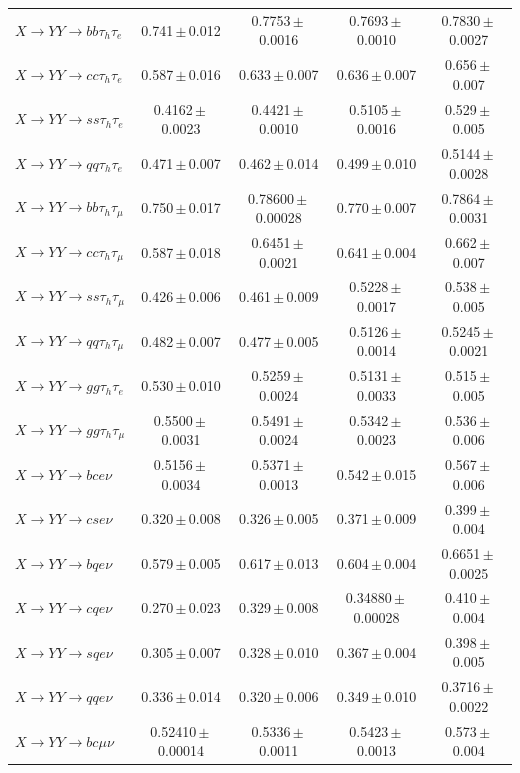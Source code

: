 \documentclass[12pt]{article}   %
\begin{document}
\begin{landscape}
{\begin{longtable}{@{\extracolsep{\fill}}lcccc@{}}
\midrule
$X\to YY\to bb\tau_h\tau_e$ & 0.741\,$\pm$\,0.012 & 0.7753\,$\pm$\,0.0016 & 0.7693\,$\pm$\,0.0010 & 0.7830\,$\pm$\,0.0027 \\
$X\to YY\to cc\tau_h\tau_e$ & 0.587\,$\pm$\,0.016 & 0.633\,$\pm$\,0.007 & 0.636\,$\pm$\,0.007 & 0.656\,$\pm$\,0.007 \\
$X\to YY\to ss\tau_h\tau_e$ & 0.4162\,$\pm$\,0.0023 & 0.4421\,$\pm$\,0.0010 & 0.5105\,$\pm$\,0.0016 & 0.529\,$\pm$\,0.005 \\
$X\to YY\to qq\tau_h\tau_e$ & 0.471\,$\pm$\,0.007 & 0.462\,$\pm$\,0.014 & 0.499\,$\pm$\,0.010 & 0.5144\,$\pm$\,0.0028 \\
$X\to YY\to bb\tau_h\tau_\mu$ & 0.750\,$\pm$\,0.017 & 0.78600\,$\pm$\,0.00028 & 0.770\,$\pm$\,0.007 & 0.7864\,$\pm$\,0.0031 \\
$X\to YY\to cc\tau_h\tau_\mu$ & 0.587\,$\pm$\,0.018 & 0.6451\,$\pm$\,0.0021 & 0.641\,$\pm$\,0.004 & 0.662\,$\pm$\,0.007 \\
$X\to YY\to ss\tau_h\tau_\mu$ & 0.426\,$\pm$\,0.006 & 0.461\,$\pm$\,0.009 & 0.5228\,$\pm$\,0.0017 & 0.538\,$\pm$\,0.005 \\
$X\to YY\to qq\tau_h\tau_\mu$ & 0.482\,$\pm$\,0.007 & 0.477\,$\pm$\,0.005 & 0.5126\,$\pm$\,0.0014 & 0.5245\,$\pm$\,0.0021 \\
$X\to YY\to gg\tau_h\tau_e$ & 0.530\,$\pm$\,0.010 & 0.5259\,$\pm$\,0.0024 & 0.5131\,$\pm$\,0.0033 & 0.515\,$\pm$\,0.005 \\
$X\to YY\to gg\tau_h\tau_\mu$ & 0.5500\,$\pm$\,0.0031 & 0.5491\,$\pm$\,0.0024 & 0.5342\,$\pm$\,0.0023 & 0.536\,$\pm$\,0.006 \\
\midrule
$X\to YY\to bce\nu$ & 0.5156\,$\pm$\,0.0034 & 0.5371\,$\pm$\,0.0013 & 0.542\,$\pm$\,0.015 & 0.567\,$\pm$\,0.006 \\
$X\to YY\to cse\nu$ & 0.320\,$\pm$\,0.008 & 0.326\,$\pm$\,0.005 & 0.371\,$\pm$\,0.009 & 0.399\,$\pm$\,0.004 \\
$X\to YY\to bqe\nu$ & 0.579\,$\pm$\,0.005 & 0.617\,$\pm$\,0.013 & 0.604\,$\pm$\,0.004 & 0.6651\,$\pm$\,0.0025 \\
$X\to YY\to cqe\nu$ & 0.270\,$\pm$\,0.023 & 0.329\,$\pm$\,0.008 & 0.34880\,$\pm$\,0.00028 & 0.410\,$\pm$\,0.004 \\
$X\to YY\to sqe\nu$ & 0.305\,$\pm$\,0.007 & 0.328\,$\pm$\,0.010 & 0.367\,$\pm$\,0.004 & 0.398\,$\pm$\,0.005 \\
$X\to YY\to qqe\nu$ & 0.336\,$\pm$\,0.014 & 0.320\,$\pm$\,0.006 & 0.349\,$\pm$\,0.010 & 0.3716\,$\pm$\,0.0022 \\
$X\to YY\to bc\mu\nu$ & 0.52410\,$\pm$\,0.00014 & 0.5336\,$\pm$\,0.0011 & 0.5423\,$\pm$\,0.0013 & 0.573\,$\pm$\,0.004 \\

\end{longtable}}
\end{landscape}
\end{document}
